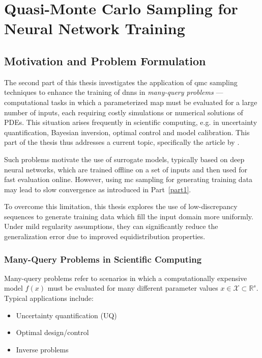 \part{Quasi-Monte Carlo Sampling for Neural Network Training}
\label{part2}

\chapter{Motivation and Problem Formulation}
\label{chapter4}

The second part of this thesis investigates the application of \acf{qmc}
sampling techniques to enhance the training of \acfp{dnn} in \emph{many-query
problems} --- computational tasks in which a parameterized map must be evaluated
for a large number of inputs, each requiring costly simulations or numerical
solutions of PDEs. This situation arises frequently in scientific computing,
e.g. in uncertainty quantification, Bayesian inversion, optimal control and
model calibration. This part of the thesis thus addresses a current topic,
specifically the article by \citeauthor{mishra2021enhancing}
\cite{mishra2021enhancing}.

Such problems motivate the use of surrogate models, typically based on deep
neural networks, which are trained offline on a set of inputs and then used for
fast evaluation online. However, using \acf{mc} sampling for generating training
data may lead to slow convergence as introduced in Part~\ref{part1}.

To overcome this limitation, this thesis explores the use of low-discrepancy
sequences to generate training data which fill the input domain more uniformly.
Under mild regularity assumptions, they can significantly reduce the
generalization error due to improved equidistribution properties.

\section{Many-Query Problems in Scientific Computing}
Many-query problems refer to scenarios in which a computationally expensive
model $f(x)$ must be evaluated for many different parameter values $x \in
\mathcal{X} \subset \mathbb{R}^s$. Typical applications include:
\begin{itemize}
  \item Uncertainty quantification (UQ)
  \item Optimal design/control
  \item Inverse problems
\end{itemize}

